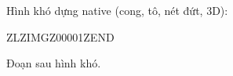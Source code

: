 \documentclass[12pt]{article}
\begin{document}
Hình khó dựng native (cong, tô, nét đứt, 3D):



ZLZIMGZ00001ZEND



Đoạn sau hình khó.
\end{document}

